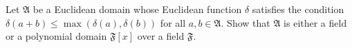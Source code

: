 Let $\mathfrak{A}$ be a Euclidean domain whose Euclidean function $\delta$ satisfies the condition $\delta(a + b) \leq \max(\delta(a), \delta(b))$ for all $a, b \in \mathfrak{A}$. Show that $\mathfrak{A}$ is either a field or a polynomial domain $\mathfrak{F}[x]$ over a field $\mathfrak{F}$.